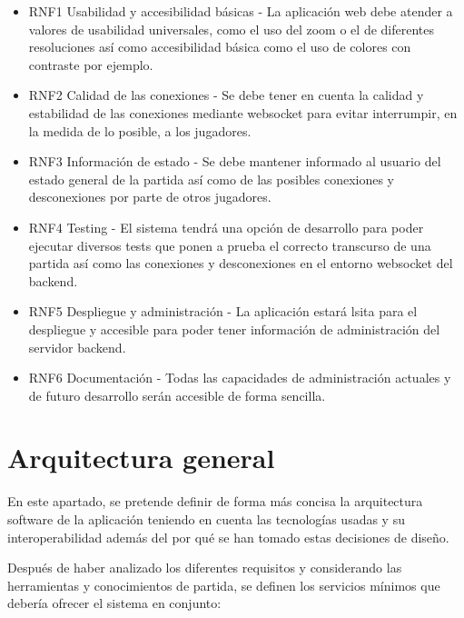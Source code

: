 \begin{itemize}
	\item RNF1 Usabilidad y accesibilidad básicas - La aplicación web debe atender a valores de usabilidad universales, como el uso del zoom o
	      el de diferentes resoluciones así como accesibilidad básica como el uso de colores con contraste por ejemplo.
	\item RNF2 Calidad de las conexiones - Se debe tener en cuenta la calidad y estabilidad de las conexiones mediante websocket para evitar
	      interrumpir, en la medida de lo posible, a los jugadores.
	\item RNF3 Información de estado - Se debe mantener informado al usuario del estado general de la partida así como de las posibles conexiones y desconexiones
	      por parte de otros jugadores.
	\item RNF4 Testing - El sistema tendrá una opción de desarrollo para poder ejecutar diversos tests que ponen
	      a prueba el correcto transcurso de una partida así como las conexiones y desconexiones en el entorno websocket del backend.
	\item RNF5 Despliegue y administración - La aplicación estará lsita para el despliegue y accesible para poder tener información de administración del servidor
	      backend.
	\item RNF6 Documentación - Todas las capacidades de administración actuales y de futuro desarrollo serán accesible de forma sencilla.
\end{itemize}

\section{Arquitectura general}

En este apartado, se pretende definir de forma más concisa la arquitectura software de la aplicación
teniendo en cuenta las tecnologías usadas y su interoperabilidad además del por qué se han tomado estas decisiones de diseño.

Después de haber analizado los diferentes requisitos y considerando las herramientas y conocimientos de partida,
se definen los servicios mínimos que debería ofrecer el sistema en conjunto:

